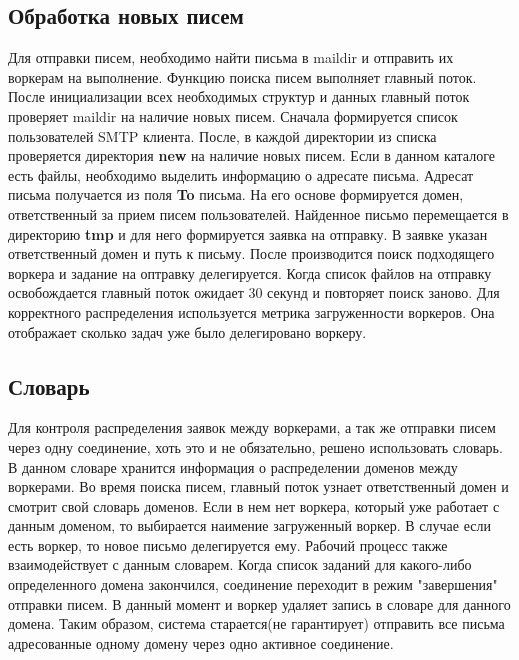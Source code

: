 \documentclass[a4paper,12pt]{report}
\begin{document}
\subsection{Обработка новых писем}
Для отправки писем, необходимо найти письма в maildir и отправить их воркерам на выполнение. Функцию поиска писем выполняет главный поток. После инициализации всех необходимых структур и данных главный поток проверяет maildir на наличие новых писем. Сначала формируется список пользователей SMTP клиента. После, в каждой директории из списка проверяется директория \textbf{new} на наличие новых писем. Если в данном каталоге есть файлы, необходимо выделить информацию о адресате письма. Адресат письма получается из поля \textbf{To} письма. На его основе формируется домен, ответственный за прием писем пользователей. 
Найденное письмо перемещается в директорию \textbf{tmp} и для него формируется заявка на отправку. В заявке указан ответственный домен и путь к письму. После производится поиск подходящего воркера и задание на оптравку делегируется. Когда список файлов на отправку освобождается главный поток ожидает 30 секунд и повторяет поиск заново. Для корректного распределения используется метрика загруженности воркеров. Она отображает сколько задач уже было делегировано воркеру.

\subsection{Словарь}
Для контроля распределения заявок между воркерами, а так же отправки писем через одну соединение, хоть это и не обязательно, решено использовать словарь. В данном словаре хранится информация о распределении доменов между воркерами. Во время поиска писем, главный поток узнает ответственный домен и смотрит свой словарь доменов. Если в нем нет воркера, который уже работает с данным доменом, то выбирается наимение загруженный воркер. В случае если есть воркер, то новое письмо делегируется ему.
Рабочий процесс также взаимодействует с данным словарем. Когда список заданий для какого-либо определенного домена закончился, соединение переходит в режим "завершения" отправки писем. В данный момент и воркер удаляет запись в словаре для данного домена. Таким образом, система старается(не гарантирует) отправить все письма адресованные одному домену через одно активное соединение.
\end{document}
